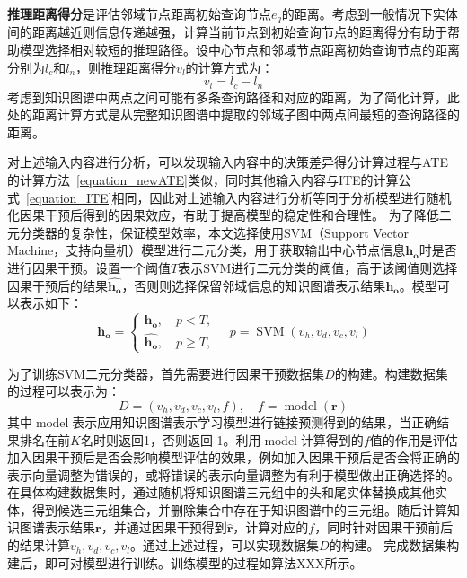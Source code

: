 \documentclass[algorithmlist, AutoFakeBold, AutoFakeSlant, figurelist, tablelist, nomlist, masters]{seuthesix}
\begin{document}
\textbf{推理距离得分}是评估邻域节点距离初始查询节点$e_q$的距离。考虑到一般情况下实体间的距离越近则信息传递越强，计算当前节点到初始查询节点的距离得分有助于帮助模型选择相对较短的推理路径。设中心节点和邻域节点距离初始查询节点的距离分别为$l_c$和$l_n$，则推理距离得分$v_l$的计算方式为：
\begin{equation}
  v_l = l_c - l_n
\end{equation}
考虑到知识图谱中两点之间可能有多条查询路径和对应的距离，为了简化计算，此处的距离计算方式是从完整知识图谱中提取的邻域子图中两点间最短的查询路径的距离。

对上述输入内容进行分析，可以发现输入内容中的决策差异得分计算过程与ATE的计算方法~\ref{equation_newATE}类似，同时其他输入内容与ITE的计算公式~\ref{equation_ITE}相同，因此对上述输入内容进行分析等同于分析模型进行随机化因果干预后得到的因果效应，有助于提高模型的稳定性和合理性。
为了降低二元分类器的复杂性，保证模型效率，本文选择使用SVM（Support Vector Machine，支持向量机）模型进行二元分类，用于获取输出中心节点信息$\bm{h_o}$时是否进行因果干预。设置一个阈值$T$表示SVM进行二元分类的阈值，高于该阈值则选择因果干预后的结果$\bm{\hat{h_o}}$，否则则选择保留邻域信息的知识图谱表示结果$\bm{h_o}$。模型可以表示如下：
\begin{equation}
  \bm{h_o} = \left\{\begin{array}{l}
  \bm{h_o},\quad p < T, \\
  \bm{\hat{h_o}},\quad p \geq T,
  \end{array} \quad p = \operatorname{SVM}\left(v_h, v_d, v_c, v_l\right)\right.
  \label{equation_SVM}
\end{equation}

为了训练SVM二元分类器，首先需要进行因果干预数据集$D$的构建。构建数据集的过程可以表示为：
\begin{equation}
  D = {(v_h, v_d, v_c, v_l, f)},\quad f = \operatorname{model}(\bm{r})
\end{equation}
其中$\operatorname{model}$表示应用知识图谱表示学习模型进行链接预测得到的结果，当正确结果排名在前$K$名时则返回1，否则返回-1。利用$\operatorname{model}$计算得到的$f$值的作用是评估加入因果干预后是否会影响模型评估的效果，例如加入因果干预后是否会将正确的表示向量调整为错误的，或将错误的表示向量调整为有利于模型做出正确选择的。
在具体构建数据集时，通过随机将知识图谱三元组中的头和尾实体替换成其他实体，得到候选三元组集合，并删除集合中存在于知识图谱中的三元组。随后计算知识图谱表示结果$\bm{r}$，并通过因果干预得到$\bm{\hat{r}}$，计算对应的$f$，同时针对因果干预前后的结果计算$v_h, v_d, v_c, v_l$。通过上述过程，可以实现数据集$D$的构建。
完成数据集构建后，即可对模型进行训练。训练模型的过程如算法XXX所示。
\end{document}
